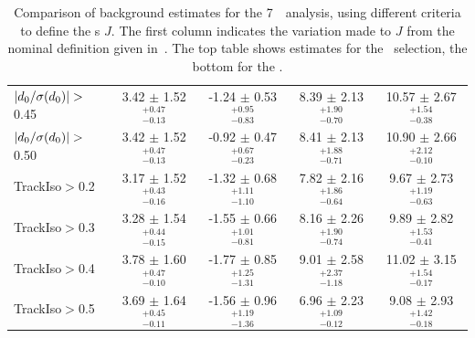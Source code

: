 \begin{table}
\begin{tabular}{lcccc}
            $|d_{0} / \sigma (d_{0} )| >$ 0.45  &  3.42 $\pm$ 1.52 $^{+0.47}_{-0.13}$ &  -1.24 $\pm$ 0.53 $^{+0.95}_{-0.83}$ &  8.39 $\pm$ 2.13 $^{+1.90}_{-0.70}$ &  10.57 $\pm$ 2.67 $^{+1.54}_{-0.38}$ \\
            $|d_{0} / \sigma (d_{0} )| >$ 0.50  &  3.42 $\pm$ 1.52 $^{+0.47}_{-0.13}$ &  -0.92 $\pm$ 0.47 $^{+0.67}_{-0.23}$ &  8.41 $\pm$ 2.13 $^{+1.88}_{-0.71}$ &  10.90 $\pm$ 2.66 $^{+2.12}_{-0.10}$ \\
TrackIso$>${0.2}                  &  3.17 $\pm$ 1.52 $^{+0.43}_{-0.16}$ &  -1.32 $\pm$ 0.68 $^{+1.11}_{-1.10}$ &  7.82 $\pm$ 2.16 $^{+1.86}_{-0.64}$ &   9.67 $\pm$ 2.73 $^{+1.19}_{-0.63}$ \\
TrackIso$>${0.3}                  &  3.28 $\pm$ 1.54 $^{+0.44}_{-0.15}$ &  -1.55 $\pm$ 0.66 $^{+1.01}_{-0.81}$ &  8.16 $\pm$ 2.26 $^{+1.90}_{-0.74}$ &   9.89 $\pm$ 2.82 $^{+1.53}_{-0.41}$ \\
TrackIso$>${0.4}                  &  3.78 $\pm$ 1.60 $^{+0.47}_{-0.10}$ &  -1.77 $\pm$ 0.85 $^{+1.25}_{-1.31}$ &  9.01 $\pm$ 2.58 $^{+2.37}_{-1.18}$ &  11.02 $\pm$ 3.15 $^{+1.54}_{-0.17}$ \\
TrackIso$>${0.5}                  &  3.69 $\pm$ 1.64 $^{+0.45}_{-0.11}$ &  -1.56 $\pm$ 0.96 $^{+1.19}_{-1.36}$ &  6.96 $\pm$ 2.23 $^{+1.09}_{-0.12}$ &   9.08 $\pm$ 2.93 $^{+1.42}_{-0.18}$ \\
\hline
\hline\hline                       
\end{tabular}           
\caption[Comparison of background estimates for the 7~\tev\ analysis, using different
criteria to define the \lljet s $J$.]{Comparison of background estimates for the
7~\tev\ analysis, using different
criteria to define the \lljet s $J$. The first column indicates the variation
made to $J$ from the nominal definition given in~. The top table shows estimates for the \ZZ\
selection, the bottom for the \ZZs.}
\label{table:bg-est-syst-seven}
\renewcommand\arraystretch{1.0}
\end{table}            

